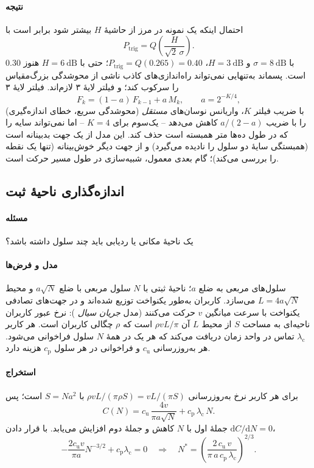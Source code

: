 \documentclass[11pt,a4paper]{article}
\begin{document}
\paragraph{نتیجه} احتمال اینکه یک نمونه در مرز از حاشیهٔ $H$ بیشتر شود برابر است با
\begin{equation}\label{eq:pingpong}
  P_{\mathrm{trig}} = Q\!\left(\frac{H}{\sqrt{2}\,\sigma}\right).
\end{equation}
با $\sigma = \qty{8}{\dB}$ و $H = \qty{3}{\dB}$، $P_{\mathrm{trig}} = Q(0.265) = 0.40$؛ حتی با
$H=\qty{6}{\dB}$ هنوز $0.30$ است. پسماند به‌تنهایی نمی‌تواند راه‌اندازی‌های کاذب ناشی از محوشدگی
بزرگ‌مقیاس را سرکوب کند؛  و فیلتر لایهٔ ۳ لازم‌اند. فیلتر لایهٔ ۳
\begin{equation}\label{eq:l3filter}
  F_k = (1-a)\,F_{k-1} + a\,M_k, \qquad a = 2^{-K/4},
\end{equation}
با ضریب فیلتر $K$، واریانس نوسان‌های \emph{مستقل} (محوشدگی سریع، خطای اندازه‌گیری) را با ضریب
$a/(2-a)$ کاهش می‌دهد -- یک‌سوم برای $K=4$ -- اما نمی‌تواند سایه را که در طول ده‌ها متر همبسته است حذف
کند. این مدل از یک جهت بدبینانه است (همبستگی سایهٔ دو سلول را نادیده می‌گیرد) و از جهت دیگر
خوش‌بینانه (تنها یک نقطه را بررسی می‌کند)؛ گام بعدی معمول، شبیه‌سازی در طول مسیر حرکت است.

\subsection{اندازه‌گذاری ناحیهٔ ثبت}\label{sec:lasize}
\paragraph{مسئله} یک ناحیهٔ مکانی یا ردیابی باید چند سلول داشته باشد؟
\paragraph{مدل و فرض‌ها} سلول‌های مربعی به ضلع $a$؛ ناحیهٔ ثبتی با $N$ سلول مربعی با ضلع $a\sqrt{N}$ و
محیط $L = 4a\sqrt{N}$ می‌سازد. کاربران به‌طور یکنواخت توزیع شده‌اند و در جهت‌های تصادفی یکنواخت با
سرعت میانگین $v$ حرکت می‌کنند (مدل \emph{جریان سیال} \cite{akyildiz1999mobility}): نرخ عبور کاربران
ناحیه‌ای به مساحت $S$ از محیط $L$ آن $\rho vL/\pi$ است که $\rho$ چگالی کاربران است. هر کاربر $\lambda_\mathrm{c}$
تماس در واحد زمان دریافت می‌کند که هر یک در همهٔ $N$ سلول فراخوانی می‌شود. هر به‌روزرسانی $c_\mathrm{u}$
و فراخوانی در هر سلول $c_\mathrm{p}$ هزینه دارد.
\paragraph{استخراج} برای هر کاربر نرخ به‌روزرسانی $\rho vL/(\pi\rho S) = vL/(\pi S)$ با $S = Na^2$ است؛ پس
\begin{equation}\label{eq:cost}
  C(N) = c_\mathrm{u}\,\frac{4v}{\pi a\sqrt{N}} + c_\mathrm{p}\,\lambda_\mathrm{c}\,N .
\end{equation}
جملهٔ اول با $N$ کاهش و جملهٔ دوم افزایش می‌یابد. با قرار دادن $\mathrm{d}C/\mathrm{d}N = 0$،
\begin{equation}\label{eq:nopt}
  -\frac{2c_\mathrm{u}v}{\pi a}N^{-3/2} + c_\mathrm{p}\lambda_\mathrm{c} = 0
  \quad\Longrightarrow\quad
  N^\ast = \left(\frac{2\,c_\mathrm{u}\,v}{\pi\,a\,c_\mathrm{p}\,\lambda_\mathrm{c}}\right)^{2/3}.
\end{equation}
\end{document}
